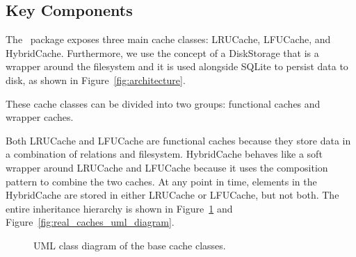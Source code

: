 \subsection{Key Components}
The \sqlitecache~package exposes three main cache classes: LRUCache, LFUCache, and HybridCache.
Furthermore, we use the concept of a DiskStorage that is a wrapper around the filesystem
and it is used alongside SQLite to persist data to disk, as shown in Figure~\ref{fig:architecture}.

These cache classes can be divided into two groups: functional caches and wrapper caches.

Both LRUCache and LFUCache are functional caches because they store data
in a combination of relations and filesystem.
HybridCache behaves like a soft wrapper around LRUCache and LFUCache because
it uses the composition pattern to combine the two caches. At any point in time,
elements in the HybridCache are stored in either LRUCache or LFUCache, but not both.
The entire inheritance hierarchy is shown in Figure~\ref{fig:base_cache_uml_diagram}
and Figure~\ref{fig:real_caches_uml_diagram}.

\begin{figure}
    \centering
    \caption{UML class diagram of the base cache classes.}
    \label{fig:base_cache_uml_diagram}
\end{figure}

